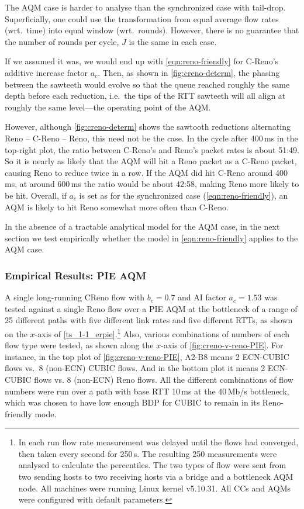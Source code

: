 The AQM case is harder to analyse than the synchronized case with tail-drop. Superficially, one could use the transformation from equal average flow rates (wrt.\ time) into equal window (wrt.\ rounds). However, there is no guarantee that the number of rounds per cycle, \(J\) is the same in each case.

If we assumed it was, we would end up with \autoref{eqn:reno-friendly} for C-Reno's additive increase factor \(a_c\). Then, as shown in \autoref{fig:creno-determ}, the phasing between the sawteeth would evolve so that the queue reached roughly the same depth before each reduction, i.e.\ the tips of the RTT sawteeth will all align at roughly the same level---the operating point of the AQM. 

However, although \autoref{fig:creno-determ} shows the sawtooth reductions alternating Reno -- C-Reno -- Reno, this need not be the case. In the cycle after 400\,ms in the top-right plot, the ratio between C-Reno's and Reno's packet rates is about 51:49. So it is nearly as likely that the AQM will hit a Reno packet as a C-Reno packet, causing Reno to reduce twice in a row. If the AQM did hit C-Reno around 400\,ms, at around 600\,ms the ratio would be about 42:58, making Reno more likely to be hit. Overall, if \(a_c\) is set as for the synchronized case (\autoref{eqn:reno-friendly}), an AQM is likely to hit Reno somewhat more often than C-Reno.

In the absence of a tractable analytical model for the AQM case, in the next section we test empirically whether the model in \autoref{eqn:reno-friendly} applies to the AQM case.

\subsubsection{Empirical Results: PIE AQM}

A single long-running CReno flow with \(b_c = 0.7\) and AI factor \(a_c=1.53\) was tested against a single Reno flow over a PIE AQM at the bottleneck of a range of 25 different paths with five different link rates and five different RTTs, as shown on the \(x\)-axis of \autoref{ts_1-1_erpie}.\footnote{In each run flow rate measurement was delayed until the flows had converged, then taken every second for 250\,s. The resulting 250 measurements were analysed to calculate the percentiles. The two types of flow were sent from two sending hosts to two receiving hosts via a bridge and a bottleneck AQM node. All machines were running Linux kernel v5.10.31. All CCs and AQMs were configured with default parameters.} Also, various combinations of numbers of each flow type were tested, as shown along the \(x\)-axis of \autoref{fig:creno-v-reno-PIE}. For instance, in the top plot of \autoref{fig:creno-v-reno-PIE}, A2-B8 means 2 ECN-CUBIC flows vs.\ 8 (non-ECN) CUBIC flows. And in the bottom plot it means 2 ECN-CUBIC flows vs. 8 (non-ECN) Reno flows. All the different combinations of flow numbers were run over a path with base RTT 10\,ms at the 40\,Mb/s bottleneck, which was chosen to have low enough BDP for CUBIC to remain in its Reno-friendly mode. 

